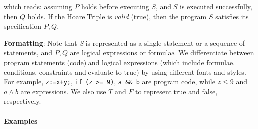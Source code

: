 \documentclass[oneside,11pt,dvipsnames]{book}
\newenvironment{commentbox}[1][]{
  \small
  \begin{mybox}
    {\small \textbf{#1}}
  }{
  \end{mybox}
}
\newcommand{\code}[1]{\texttt{#1}}
\begin{document}
\noindent which reads: assuming $P$ holds before executing $S$, and $S$ is executed successfully, then $Q$  holds.  If the Hoare Triple is \emph{valid} (true), then the program $S$ satisfies its specification $P, Q$. 


\begin{commentbox}{\textbf{Formatting}: }
    Note that $S$ is represented as a single statement or a sequence of statements, and $P, Q$ are logical expressions or formulae.      
    We differentiate between program statements (code) and logical expressions (which include formulae, conditions, constraints and evaluate to true) by using different fonts and styles. For example, \code{z:=x+y;}, \code{if (z >= 9)}, \code{a \&\& b} are program code, while  $z \le 9$ and $a \land b$ are expressions. We also use $T$ and $F$ to represent true and false, respectively.
\end{commentbox}



    
\paragraph{Examples}
\end{document}
